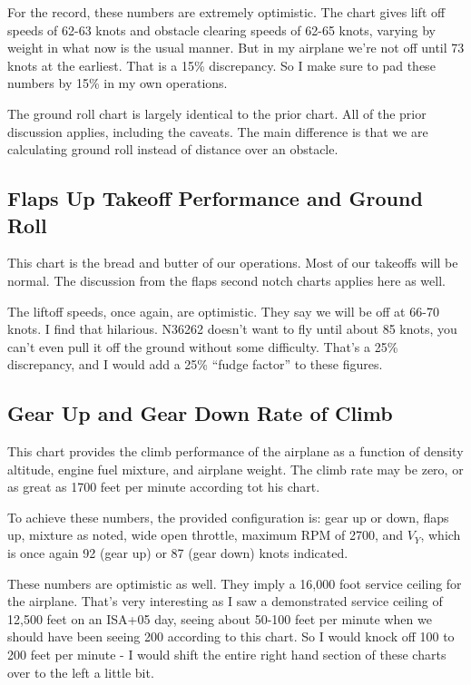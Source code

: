 For the record, these numbers are extremely optimistic. The chart gives lift off speeds of 62-63 knots and obstacle clearing speeds of 62-65 knots, varying by weight in what now is the usual manner. But in my airplane we're not off until 73 knots at the earliest. That is a 15\% discrepancy. So I make sure to pad these numbers by 15\% in my own operations.

The ground roll chart is largely identical to the prior chart. All of the prior discussion applies, including the caveats. The main difference is that we are calculating ground roll instead of distance over an obstacle.

\subsection{Flaps Up Takeoff Performance and Ground Roll}

This chart is the bread and butter of our operations. Most of our takeoffs will be normal. The discussion from the flaps second notch charts applies here as well.

The liftoff speeds, once again, are optimistic. They say we will be off at 66-70 knots. I find that hilarious. N36262 doesn't want to fly until about 85 knots, you can't even pull it off the ground without some difficulty. That's a 25\% discrepancy, and I would add a 25\% ``fudge factor'' to these figures.

\subsection{Gear Up and Gear Down Rate of Climb}

This chart provides the climb performance of the airplane as a function of density altitude, engine fuel mixture, and airplane weight. The climb rate may be zero, or as great as 1700 feet per minute according tot his chart.

To achieve these numbers, the provided configuration is: gear up or down, flaps up, mixture as noted, wide open throttle, maximum RPM of 2700, and $V_Y$, which is once again 92 (gear up) or 87 (gear down) knots indicated.

These numbers are optimistic as well. They imply a 16,000 foot service ceiling for the airplane. That's very interesting as I saw a demonstrated service ceiling of 12,500 feet on an ISA+05 day, seeing about 50-100 feet per minute when we should have been seeing 200 according to this chart. So I would knock off 100 to 200 feet per minute - I would shift the entire right hand section of these charts over to the left a little bit.

